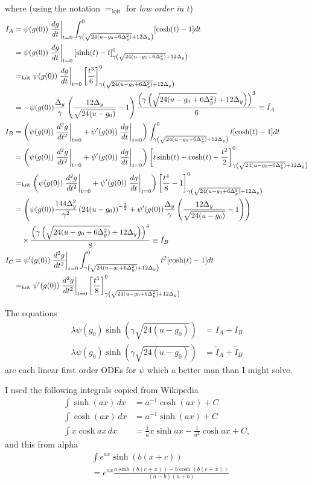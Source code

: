 \documentclass[twocolumn]{article}
\begin{document}
\newcommand{\loit}{=_\text{loit}}
\newcommand{\DG}{\frac{\Delta_y}{\gamma} \left( \frac{12 \Delta_y}
    { \sqrt{24(u-g_0)} } - 1 \right) }
\newcommand{\DDG}{\frac{144 \Delta^2_y}{\gamma^2} \left(24(u-g_0)
  \right)^{-\frac{3}{2}} }
where (using the notation $\loit$ for \emph{low order in $t$})
\begin{align*}
  I_{A} &= \psi(g(0)) \left. \frac{d g}{d t} \right|_{t=0}
  \INT [\cosh(t) - 1] dt \\
  &= \psi(g(0)) \left. \frac{d g}{d t} \right|_{t=0}
  [\sinh(t) - t]\RANGE \\
  &\loit \psi(g(0)) \left. \frac{d g}{d t} \right|_{t=0}
  \left[\frac{t^3}{6} \right]\RANGE\\
  &= -\psi(g(0)) \DG \frac{ \left( \LOW \right)^3 }{6} \equiv \tilde
  I_A \\
  I_{B} &=  \left(
    \psi(g(0)) \left. \frac{d^2 g}{d t^2} \right|_{t=0}
    + \psi'(g(0)) \left. \frac{d g}{d t} \right|_{t=0}
  \right)
  \INT t [\cosh(t) - 1] dt \\
  &=  \left(
    \psi(g(0)) \left. \frac{d^2 g}{d t^2} \right|_{t=0}
    + \psi'(g(0)) \left. \frac{d g}{d t} \right|_{t=0}
  \right)
  \left[ t\sinh(t) - \cosh(t) - \frac{t^2}{2} \right] \RANGE \\
  &\loit  \left(
    \psi(g(0)) \left. \frac{d^2 g}{d t^2} \right|_{t=0}
    + \psi'(g(0)) \left. \frac{d g}{d t} \right|_{t=0}
  \right)
  \left[ \frac{t^4}{8} -1 \right]\RANGE \\
  &= \left( \psi(g(0)) \DDG + \psi'(g(0)) \DG \right) \\
  &\quad \times \frac{ \left( \LOW \right)^4 }{8} \equiv \tilde I_B\\
  I_{C} &= \psi'(g(0)) \left. \frac{d^2 g}{d t^2} \right|_{t=0}
  \INT t^2 [\cosh(t) - 1 ]dt \\
  &\loit \psi'(g(0)) \left. \frac{d^2 g}{d t^2} \right|_{t=0} \left[
    \frac{ t^5 }{ 8 } \right]\RANGE
\end{align*}

The equations
\begin{align*}
  \lambda \psi(g_0) \sinh\left(\gamma \sqrt{24(u-g_0)} \right) &= I_A
  + I_B \\
  \lambda \psi(g_0) \sinh\left(\gamma \sqrt{24(u-g_0)} \right) &=
  \tilde I_A + \tilde I_B
\end{align*}
are each linear first order ODEs for $\psi$ which a better man than I
might solve.

I used the following integrals copied from Wikipedia
\begin{align*}
  \int \sinh (ax)\,dx &= a^{-1} \cosh (ax) + C \\
  \int \cosh (ax)\,dx &= a^{-1} \sinh (ax) + C \\
  \int x\cosh ax\,dx &= \frac{1}{a} x\sinh ax - \frac{1}{a^2}\cosh
  ax+C,
\end{align*} 
and this from alpha
\begin{align*}
  & \int e^{ax} \sinh(b(x+c)) \\
  &= e^{ax} \frac{a \sinh(b(c+x)) - b \cosh(b(c+x))}{(a-b)(a+b)}
\end{align*}
\end{document}
